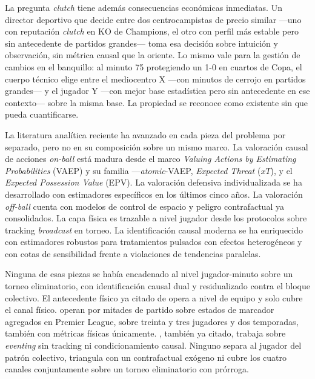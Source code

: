 La pregunta \textit{clutch} tiene además consecuencias económicas
inmediatas. Un director deportivo que decide entre dos centrocampistas
de precio similar ---uno con reputación \textit{clutch} en KO de
Champions, el otro con perfil más estable pero sin antecedente de
partidos grandes--- toma esa decisión sobre intuición y observación,
sin métrica causal que la oriente. Lo mismo vale para la gestión de
cambios en el banquillo: al minuto 75 protegiendo un 1-0 en cuartos
de Copa, el cuerpo técnico elige entre el mediocentro X ---con
minutos de cerrojo en partidos grandes--- y el jugador Y ---con mejor
base estadística pero sin antecedente en ese contexto--- sobre la
misma base. La propiedad se reconoce como existente sin que pueda
cuantificarse.

La literatura analítica reciente ha avanzado en cada pieza del problema
por separado, pero no en su composición sobre un mismo marco. La
valoración causal de acciones \emph{on-ball} está madura desde el marco
\textit{Valuing Actions by Estimating Probabilities} (VAEP) y su familia
---\textit{atomic}-VAEP, \textit{Expected Threat} ($xT$), y el
\textit{Expected Possession Value} (EPV). La valoración defensiva individualizada se ha
desarrollado con estimadores específicos en los últimos cinco años. La
valoración \emph{off-ball} cuenta con modelos de control de espacio y
peligro contrafactual ya consolidados. La capa física es trazable a
nivel jugador desde los protocolos sobre tracking \emph{broadcast} en
torneo. La identificación causal moderna se ha enriquecido con
estimadores robustos para tratamientos pulsados con efectos heterogéneos
y con cotas de sensibilidad frente a violaciones de tendencias
paralelas.

Ninguna de esas piezas se había encadenado al nivel jugador-minuto sobre
un torneo eliminatorio, con identificación causal dual y residualizado
contra el bloque colectivo. El antecedente físico ya citado de
\textcite{Konefal2024} opera a nivel de equipo y solo cubre el canal
físico. \textcite{Morgans2025} operan por mitades de partido sobre
estados de marcador agregados en Premier League, sobre treinta y tres
jugadores y dos temporadas, también con métricas físicas únicamente.
\textcite{Bransen2019Choke}, también ya citado, trabaja sobre
\textit{eventing} sin tracking ni condicionamiento causal. Ninguno separa al jugador del patrón colectivo, triangula con un
contrafactual exógeno ni cubre los cuatro canales conjuntamente sobre
un torneo eliminatorio con prórroga.

